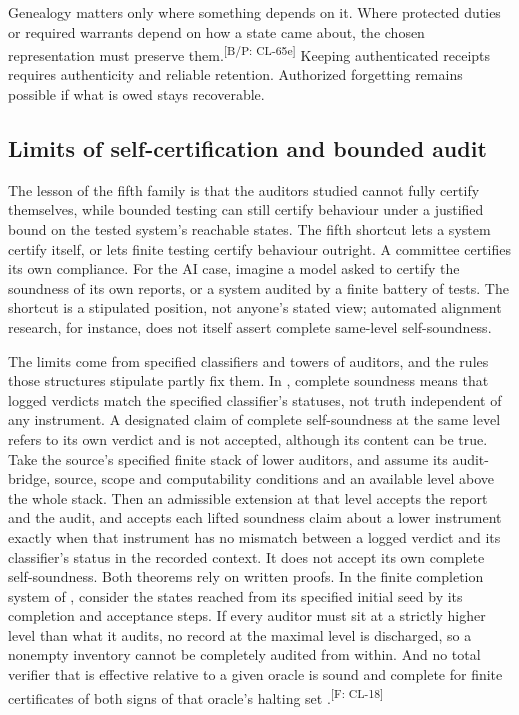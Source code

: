 \documentclass[pdflatex,sn-basic]{sn-jnl}%
\newcommand{\slot}[1]{}%
\newcommand{\claim}[2]{\ifannotated\textsuperscript{\textcolor{blue!60!black}{\tiny[#1: #2]}}\fi}
\begin{document}
Genealogy matters only where something depends on it. Where protected duties or required warrants depend on how a state came about, the chosen representation must preserve them.\claim{B/P}{CL-65e} Keeping authenticated receipts requires authenticity and reliable retention. Authorized forgetting remains possible if what is owed stays recoverable.

\subsection{Limits of self-certification and bounded audit}\label{sec:audit-limits}

\slot{5.5}
The lesson of the fifth family is that the auditors studied cannot fully certify themselves, while bounded testing can still certify behaviour under a justified bound on the tested system's reachable states. The fifth shortcut lets a system certify itself, or lets finite testing certify behaviour outright. A committee certifies its own compliance. For the AI case, imagine a model asked to certify the soundness of its own reports, or a system audited by a finite battery of tests. The shortcut is a stipulated position, not anyone's stated view; automated alignment research, for instance, does not itself assert complete same-level self-soundness.

The limits come from specified classifiers and towers of auditors, and the rules those structures stipulate partly fix them. In \citet{tsiokos2026f3}, complete soundness means that logged verdicts match the specified classifier's statuses, not truth independent of any instrument. A designated claim of complete self-soundness at the same level refers to its own verdict and is not accepted, although its content can be true. Take the source's specified finite stack of lower auditors, and assume its audit-bridge, source, scope and computability conditions and an available level above the whole stack. Then an admissible extension at that level accepts the report and the audit, and accepts each lifted soundness claim about a lower instrument exactly when that instrument has no mismatch between a logged verdict and its classifier's status in the recorded context. It does not accept its own complete self-soundness. Both theorems rely on written proofs. In the finite completion system of \citet{tsiokos2026v11}, consider the states reached from its specified initial seed by its completion and acceptance steps. If every auditor must sit at a strictly higher level than what it audits, no record at the maximal level is discharged, so a nonempty inventory cannot be completely audited from within. And no total verifier that is effective relative to a given oracle is sound and complete for finite certificates of both signs of that oracle's halting set \citep{tsiokos2026v5}.\claim{F}{CL-18}
\end{document}

